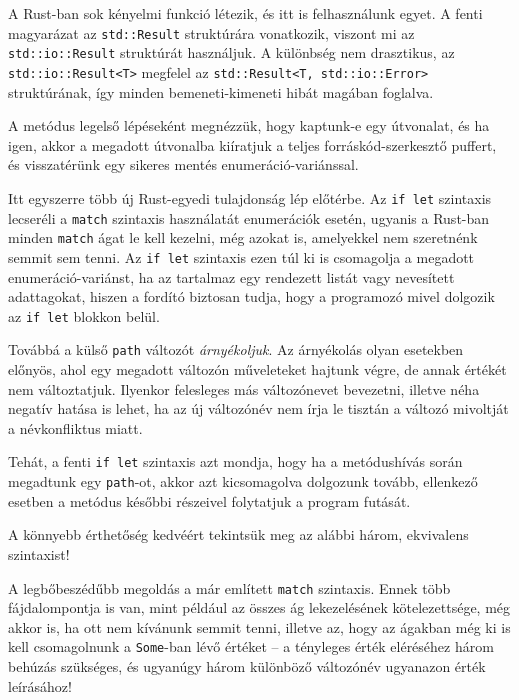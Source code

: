 A Rust-ban sok kényelmi funkció létezik, és itt is felhasználunk egyet.
A fenti magyarázat az \texttt{std::Result} struktúrára vonatkozik, viszont mi az
\texttt{std::io::Result} struktúrát használjuk.
A különbség nem drasztikus, az \texttt{std::io::Result<T>} megfelel az \texttt{std::Result<T, std::io::Error>}
struktúrának, így minden bemeneti-kimeneti hibát magában foglalva.

A metódus legelső lépéseként megnézzük, hogy kaptunk-e egy útvonalat, és ha igen,
akkor a megadott útvonalba kiíratjuk a teljes forráskód-szerkesztő puffert,
és visszatérünk egy sikeres mentés enumeráció-variánssal.



Itt egyszerre több új Rust-egyedi tulajdonság lép előtérbe.
Az \texttt{if let} szintaxis lecseréli a \texttt{match} szintaxis használatát enumerációk esetén,
ugyanis a Rust-ban minden \texttt{match} ágat le kell kezelni, még azokat is, 
amelyekkel nem szeretnénk semmit sem tenni.
Az \texttt{if let} szintaxis ezen túl ki is csomagolja a megadott enumeráció-variánst, 
ha az tartalmaz egy rendezett listát vagy nevesített adattagokat,
hiszen a fordító biztosan tudja, hogy a programozó mivel dolgozik az \texttt{if let} blokkon belül. 

Továbbá a külső \texttt{path} változót \textit{árnyékoljuk}.
Az árnyékolás olyan esetekben előnyös, ahol egy megadott változón műveleteket hajtunk végre,
de annak értékét nem változtatjuk.
Ilyenkor felesleges más változónevet bevezetni, illetve néha negatív hatása is lehet,
ha az új változónév nem írja le tisztán a változó mivoltját a névkonfliktus miatt.

Tehát, a fenti \texttt{if let} szintaxis azt mondja, hogy ha a metódushívás során
megadtunk egy \texttt{path}-ot, akkor azt kicsomagolva dolgozunk tovább,
ellenkező esetben a metódus későbbi részeivel folytatjuk a program futását.

A könnyebb érthetőség kedvéért tekintsük meg az alábbi három, ekvivalens szintaxist!



A legbőbeszédűbb megoldás a már említett \texttt{match} szintaxis.
Ennek több fájdalompontja is van, mint például az összes ág lekezelésének kötelezettsége,
még akkor is, ha ott nem kívánunk semmit tenni, illetve az, 
hogy az ágakban még ki is kell csomagolnunk a \texttt{Some}-ban lévő értéket --
a tényleges érték eléréséhez három behúzás szükséges, 
és ugyanúgy három különböző változónév ugyanazon érték leírásához!


